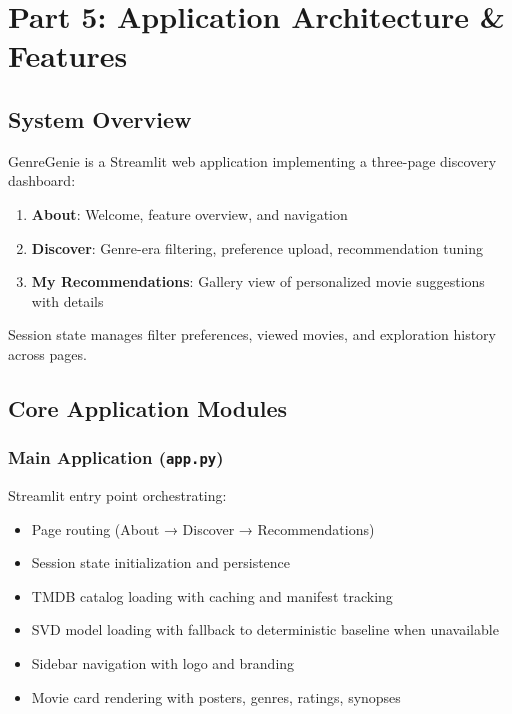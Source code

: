 \documentclass[11pt,a4paper]{article}
\begin{document}

\section{Part 5: Application Architecture \& Features}

\subsection{System Overview}

GenreGenie is a Streamlit web application implementing a three-page discovery dashboard:

\begin{enumerate}
    \item \textbf{About}: Welcome, feature overview, and navigation
    \item \textbf{Discover}: Genre-era filtering, preference upload, recommendation tuning
    \item \textbf{My Recommendations}: Gallery view of personalized movie suggestions with details
\end{enumerate}

Session state manages filter preferences, viewed movies, and exploration history across pages.

\subsection{Core Application Modules}

\subsubsection{Main Application (\texttt{app.py})}

Streamlit entry point orchestrating:

\begin{itemize}
    \item Page routing (About → Discover → Recommendations)
    \item Session state initialization and persistence
    \item TMDB catalog loading with caching and manifest tracking
    \item SVD model loading with fallback to deterministic baseline when unavailable
    \item Sidebar navigation with logo and branding
    \item Movie card rendering with posters, genres, ratings, synopses
\end{itemize}
\end{document}
